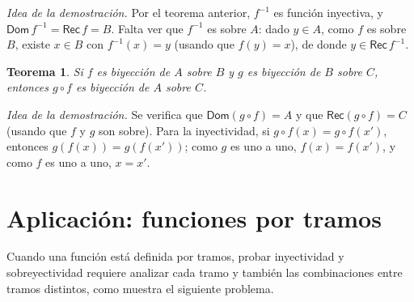 \documentclass[11pt]{article}
\newtheorem*{teorema}{Teorema}
\begin{document}
\emph{Idea de la demostración.} Por el teorema anterior, $f^{-1}$ es función
inyectiva, y $\mathsf{Dom}\,f^{-1} = \mathsf{Rec}\,f = B$. Falta ver que
$f^{-1}$ es sobre $A$: dado $y \in A$, como $f$ es sobre $B$, existe $x \in B$
con $f^{-1}(x) = y$ (usando que $f(y)=x$), de donde $y \in \mathsf{Rec}\,f^{-1}$.

\begin{teorema}
Si $f$ es biyección de $A$ sobre $B$ y $g$ es biyección de $B$ sobre $C$,
entonces $g\circ f$ es biyección de $A$ sobre $C$.
\end{teorema}

\emph{Idea de la demostración.} Se verifica que $\mathsf{Dom}(g\circ f) = A$ y
que $\mathsf{Rec}(g\circ f) = C$ (usando que $f$ y $g$ son sobre). Para la
inyectividad, si $g\circ f(x) = g\circ f(x')$, entonces $g(f(x)) = g(f(x'))$;
como $g$ es uno a uno, $f(x)=f(x')$, y como $f$ es uno a uno, $x=x'$.

\section{Aplicación: funciones por tramos}

Cuando una función está definida por tramos, probar inyectividad y
sobreyectividad requiere analizar cada tramo y también las combinaciones entre
tramos distintos, como muestra el siguiente problema.
\end{document}
